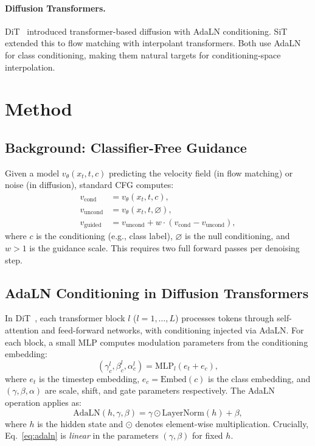 \documentclass{article}
\newcommand{\adaln}{AdaLN}
\begin{document}
\paragraph{Diffusion Transformers.}
DiT~\citep{peebles2023scalable} introduced transformer-based diffusion with \adaln{} conditioning. SiT~\citep{ma2024sit} extended this to flow matching with interpolant transformers. Both use \adaln{} for class conditioning, making them natural targets for conditioning-space interpolation.

\section{Method}
\label{sec:method}

\subsection{Background: Classifier-Free Guidance}

Given a model $v_\theta(x_t, t, c)$ predicting the velocity field (in flow matching) or noise (in diffusion), standard CFG computes:
\begin{align}
    v_{\text{cond}} &= v_\theta(x_t, t, c), \label{eq:cfg_cond} \\
    v_{\text{uncond}} &= v_\theta(x_t, t, \varnothing), \label{eq:cfg_uncond} \\
    v_{\text{guided}} &= v_{\text{uncond}} + w \cdot (v_{\text{cond}} - v_{\text{uncond}}), \label{eq:cfg}
\end{align}
where $c$ is the conditioning (e.g., class label), $\varnothing$ is the null conditioning, and $w > 1$ is the guidance scale. This requires two full forward passes per denoising step.

\subsection{AdaLN Conditioning in Diffusion Transformers}

In DiT~\citep{peebles2023scalable}, each transformer block $l$ ($l = 1, \ldots, L$) processes tokens through self-attention and feed-forward networks, with conditioning injected via \adaln{}. For each block, a small MLP computes modulation parameters from the conditioning embedding:
\begin{equation}
    (\gamma_c^l, \beta_c^l, \alpha_c^l) = \text{MLP}_l(e_t + e_c),
\end{equation}
where $e_t$ is the timestep embedding, $e_c = \text{Embed}(c)$ is the class embedding, and $(\gamma, \beta, \alpha)$ are scale, shift, and gate parameters respectively. The \adaln{} operation applies as:
\begin{equation}
    \text{\adaln{}}(h, \gamma, \beta) = \gamma \odot \text{LayerNorm}(h) + \beta,
    \label{eq:adaln}
\end{equation}
where $h$ is the hidden state and $\odot$ denotes element-wise multiplication. Crucially, Eq.~\eqref{eq:adaln} is \textit{linear} in the parameters $(\gamma, \beta)$ for fixed $h$.
\end{document}
